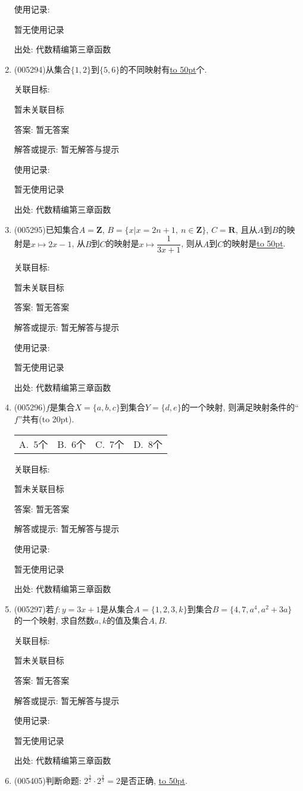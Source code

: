 \documentclass[10pt,a4paper]{article}
\newcommand{\blank}[1]{\underline{\hbox to #1pt{}}}
\newcommand{\bracket}[1]{(\hbox to #1pt{})}
\newcommand{\fourch}[4]{\par\begin{tabular}{p{.23\textwidth}p{.23\textwidth}p{.23\textwidth}p{.23\textwidth}}
A.~#1 &B.~#2& C.~#3& D.~#4
\end{tabular}}
\begin{document}
\begin{enumerate}[1.]
使用记录:

暂无使用记录


出处: 代数精编第三章函数
\item { (005294)}从集合$\{1,2\}$到$\{5,6\}$的不同映射有\blank{50}个.


关联目标:

暂未关联目标

答案: 暂无答案

解答或提示: 暂无解答与提示

使用记录:

暂无使用记录


出处: 代数精编第三章函数
\item { (005295)}已知集合$A=\mathbf{Z}$, $B=\{x|x=2n+1, \ n\in \mathbf{Z}\}$, $C=\mathbf{R}$, 且从$A$到$B$的映射是$x\mapsto 2x-1$, 从$B$到$C$的映射是$x\mapsto \dfrac 1{3x+1}$, 则从$A$到$C$的映射是\blank{50}.


关联目标:

暂未关联目标

答案: 暂无答案

解答或提示: 暂无解答与提示

使用记录:

暂无使用记录


出处: 代数精编第三章函数
\item { (005296)}$f$是集合$X=\{a,b,c\}$到集合$Y=\{d,e\}$的一个映射, 则满足映射条件的``$f$''共有\bracket{20}.
\fourch{$5$个}{$6$个}{$7$个}{$8$个}


关联目标:

暂未关联目标

答案: 暂无答案

解答或提示: 暂无解答与提示

使用记录:

暂无使用记录


出处: 代数精编第三章函数
\item { (005297)}若$f:y=3x+1$是从集合$A=\{1,2,3,k\}$到集合$B=\{4,7,a^4,a^2+3a\}$的一个映射, 求自然数$a,k$的值及集合$A,B$.


关联目标:

暂未关联目标

答案: 暂无答案

解答或提示: 暂无解答与提示

使用记录:

暂无使用记录


出处: 代数精编第三章函数
\item { (005405)}判断命题: $2^{\frac 32}\cdot 2^{\frac 23}=2$是否正确, \blank{50}.



\end{enumerate}
\end{document}
